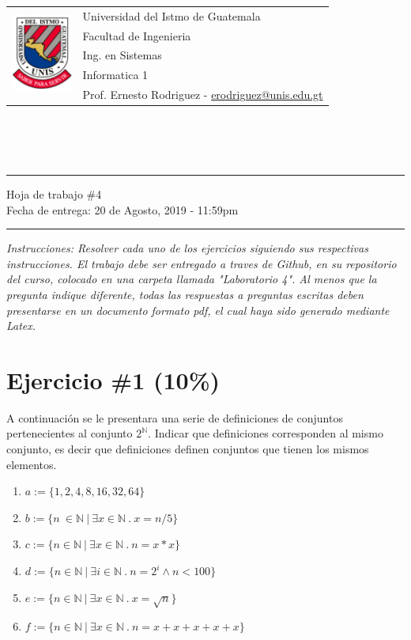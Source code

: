 \documentclass{article}
\newcommand{\horrule}[1]{\rule{\linewidth}{#1}}
\begin{document}
\begin{tabular}{l l}
\multirow{5}{*}{\includegraphics[width=2cm]{../../recursos/logo.png}}
 & Universidad del Istmo de Guatemala \\
 & Facultad de Ingenieria \\
 & Ing. en Sistemas \\
 & Informatica 1 \\
 & Prof. Ernesto Rodriguez - \href{mailto:erodriguez@unis.edu.gt}{erodriguez@unis.edu.gt} \\
\end{tabular}
\\\\\\

\begin{center}
        \horrule{0.5pt}
        \huge{Hoja de trabajo \#4} \\
        \large{Fecha de entrega: 20 de Agosto, 2019 - 11:59pm} \\
        \horrule{1pt}
\end{center}

\emph{Instrucciones: Resolver cada uno de los ejercicios siguiendo sus respectivas
instrucciones. El trabajo debe ser entregado a traves de Github, en su repositorio del curso, colocado en una carpeta llamada "Laboratorio 4".
Al menos que la pregunta indique diferente, todas las respuestas a preguntas escritas deben presentarse en
un documento formato pdf, el cual haya sido generado mediante Latex. }

\section*{Ejercicio \#1 (10\%)}
A continuaci\'on se le presentara una serie de definiciones de conjuntos pertenecientes al
conjunto $2^{\mathbb{N}}$. Indicar que definiciones corresponden al mismo conjunto, es decir
que definiciones definen conjuntos que tienen los mismos elementos.
\begin{enumerate}
        \item{$a:=\{1,2,4,8,16,32,64\}$}
        \item{$b:=\{n\ \in \mathbb{N}\ |\ \exists x \in \mathbb{N}\ .\ x=n/5 \}$}
        \item{$c:=\{n\in \mathbb{N}\ |\ \exists x\in\mathbb{N}\ .\ n=x*x \}$}
        \item{$d:=\{n\in\mathbb{N}\ |\ \exists i\in\mathbb{N}\ .\ n=2^i\wedge n<100 \}$}
        \item{$e:=\{ n\in\mathbb{N}\ |\ \exists x\in \mathbb{N}\ .\ x=\sqrt{n} \}$}
        \item{$f:=\{ n\in\mathbb{N}\ |\ \exists x\in \mathbb{N}\ .\ n=x+x+x+x+x \}$}
\end{enumerate}
\end{document}
